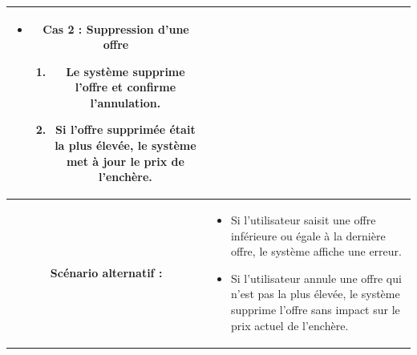 \begin{longtable}{|c|p{11cm}|}
\begin{enumerate}
\begin{itemize}
\item \textbf{Cas 2 : Suppression d’une offre}
\begin{enumerate}
\item Le système supprime l’offre et confirme l’annulation.
\item Si l’offre supprimée était la plus élevée, le système met à jour le prix de l’enchère.
\end{enumerate}

\end{itemize}

\end{enumerate} \\
\hline
\cellcolor{coloranimarket} \textbf{Scénario alternatif :} &
\begin{itemize}
\item Si l’utilisateur saisit une offre inférieure ou égale à la dernière offre, le système affiche une erreur.
\item Si l’utilisateur annule une offre qui n’est pas la plus élevée, le système supprime l’offre sans impact sur le prix actuel de l’enchère.
\end{itemize} \\
\hline
\end{longtable} 
\newpage 


